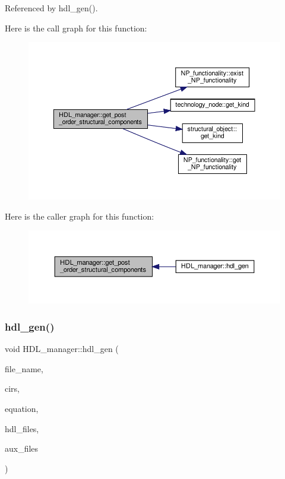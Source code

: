 Referenced by hdl\+\_\+gen().

Here is the call graph for this function\+:
\nopagebreak
\begin{figure}[H]
\begin{center}
\leavevmode
\includegraphics[width=350pt]{d7/d32/classHDL__manager_a5f8b1b3812244b35f3d58f639903e3d8_cgraph}
\end{center}
\end{figure}
Here is the caller graph for this function\+:
\nopagebreak
\begin{figure}[H]
\begin{center}
\leavevmode
\includegraphics[width=350pt]{d7/d32/classHDL__manager_a5f8b1b3812244b35f3d58f639903e3d8_icgraph}
\end{center}
\end{figure}
\mbox{\label{classHDL__manager_a0884dfde508d0a59bc176d65b51fc5b7}} 
\subsubsection{\texorpdfstring{hdl\+\_\+gen()}{hdl\_gen()}}
{\footnotesize\ttfamily void H\+D\+L\+\_\+manager\+::hdl\+\_\+gen (\begin{DoxyParamCaption}\item[{const std\+::string \&}]{file\+\_\+name,  }\item[{const std\+::list$<$ \hyperlink{structural__objects_8hpp_a8ea5f8cc50ab8f4c31e2751074ff60b2}{structural\+\_\+object\+Ref} $>$ \&}]{cirs,  }\item[{bool}]{equation,  }\item[{std\+::list$<$ std\+::string $>$ \&}]{hdl\+\_\+files,  }\item[{std\+::list$<$ std\+::string $>$ \&}]{aux\+\_\+files }\end{DoxyParamCaption})}



